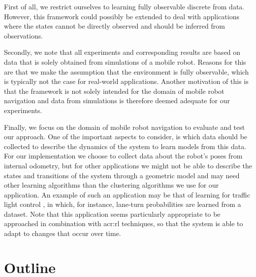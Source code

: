 First of all, we restrict ourselves to learning fully observable discrete  from data.
However, this framework could possibly be extended to deal with applications where the states cannot be directly observed and should be inferred from observations.

Secondly, we note that all experiments and corresponding results are based on data that is solely obtained from simulations of a mobile robot.
Reasons for this are that we make the assumption that the environment is fully observable, which is typically not the case for real-world applications.
Another motivation of this is that the framework is not solely intended for the domain of mobile robot navigation and data from simulations is therefore deemed adequate for our experiments. %

Finally, we focus on the domain of mobile robot navigation to evaluate and test our approach.
One of the important aspects to consider, is which data should be collected to describe the dynamics of the system to learn models from this data.
For our implementation we choose to collect data about the robot's poses from internal odometry, but for other applications we might not be able to describe the states and transitions of the system through a geometric model and may need other learning algorithms than the clustering algorithms we use for our application.
An example of such an application may be that of learning  for traffic light control \cite{wiering2004intelligent, delgado2011efficient}, in which, for instance, lane-turn probabilities are learned from a dataset.
Note that this application seems particularly appropriate to be approached in combination with \acrshort{acr:rl} techniques, so that the system is able to adapt to changes that occur over time.


\section{Outline}
\label{sec:introduction-outline}

